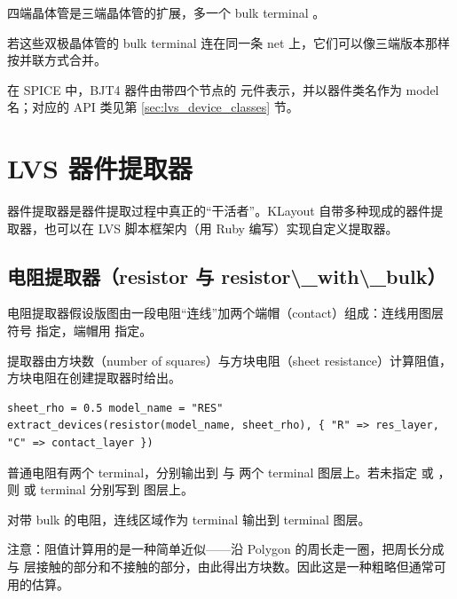 
四端晶体管是三端晶体管的扩展，多一个 bulk terminal 。

若这些双极晶体管的 bulk terminal 连在同一条 net 上，它们可以像三端版本那样按并联方式合并。

在 SPICE 中，BJT4 器件由带四个节点的  元件表示，并以器件类名作为 model 名；对应的 API 类见第 \ref{sec:lvs_device_classes} 节。

\section{LVS 器件提取器}\label{sec:lvs_device_extractors}

器件提取器是器件提取过程中真正的“干活者”。KLayout 自带多种现成的器件提取器，也可以在 LVS 脚本框架内（用 Ruby 编写）实现自定义提取器。

\subsection{电阻提取器（resistor 与 resistor\textbackslash{}\_with\textbackslash{}\_bulk）}

电阻提取器假设版图由一段电阻“连线”加两个端帽（contact）组成：连线用图层符号  指定，端帽用  指定。


提取器由方块数（number of squares）与方块电阻（sheet resistance）计算阻值，方块电阻在创建提取器时给出。

\begin{lstlisting}
sheet_rho = 0.5 model_name = "RES" extract_devices(resistor(model_name, sheet_rho), { "R" => res_layer, "C" => contact_layer })
\end{lstlisting}

普通电阻有两个 terminal，分别输出到  与  两个 terminal 图层上。若未指定  或 ，则  或  terminal 分别写到  图层上。


对带 bulk 的电阻，连线区域作为  terminal 输出到  terminal 图层。


注意：阻值计算用的是一种简单近似——沿  Polygon 的周长走一圈，把周长分成与  层接触的部分和不接触的部分，由此得出方块数。因此这是一种粗略但通常可用的估算。

